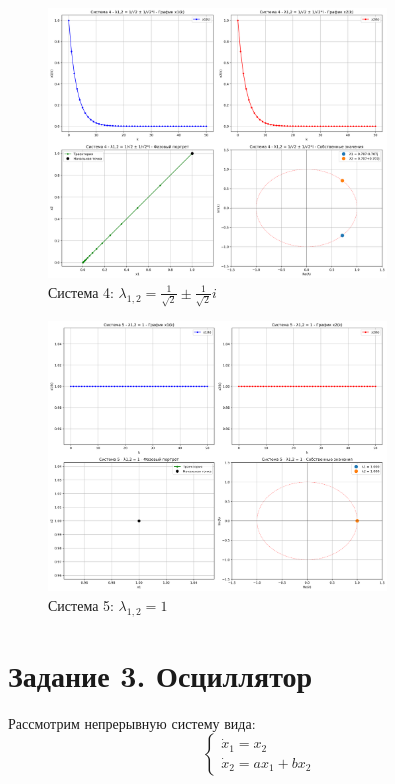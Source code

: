\begin{figure}[h!]
\centering
\includegraphics[width=0.8\textwidth]{images/task2/system_4_lambda_1_sqrt2_pm_i_sqrt2.png}
\caption{Система 4: $\lambda_{1,2} = \frac{1}{\sqrt{2}} \pm \frac{1}{\sqrt{2}}i$}
\label{fig:discrete4}
\end{figure}

\begin{figure}[h!]
\centering
\includegraphics[width=0.8\textwidth]{images/task2/system_5_lambda_1.png}
\caption{Система 5: $\lambda_{1,2} = 1$}
\label{fig:discrete5}
\end{figure}

\section{Задание 3. Осциллятор}

Рассмотрим непрерывную систему вида:
\begin{equation}
\begin{cases}
\dot{x}_1 = x_2 \\
\dot{x}_2 = ax_1 + bx_2
\end{cases}
\end{equation}

